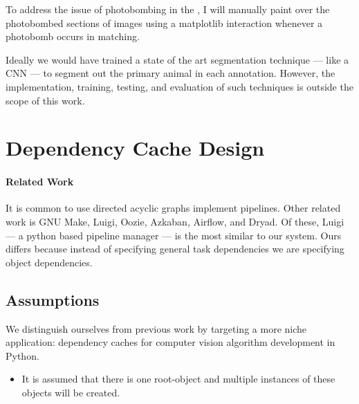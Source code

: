             To address the issue of photobombing in the \GGR{}, I will
              manually paint over the photobombed sections of images
              using a matplotlib  interaction whenever a
              photobomb occurs in matching.

            Ideally we would have trained a state of the art segmentation
              technique --- like a CNN --- to segment out the primary animal in
              each annotation.
            However, the implementation, training, testing, and evaluation of
              such techniques is outside the scope of this work.
\begin{comment}
./mass_tex_fixes.py --outline --fpaths chapter5-systemchapter.tex --numlines=1
\end{comment}


\section{Dependency Cache Design}\label{sec:depc}

    \paragraph{Related Work}

        It is common to use directed acyclic graphs implement
          pipelines.
        Other related work is GNU Make, Luigi, Oozie, Azkaban,
          Airflow, and Dryad.
        Of these, Luigi --- a python based pipeline manager --- is the
          most similar to our system.
        Ours differs because instead of specifying general task
          dependencies we are specifying object dependencies.

    \subsection{Assumptions}
        We distinguish ourselves from previous work by targeting a
          more niche application:
        dependency caches for computer vision algorithm development in
          Python.

         \begin{itemize}
            \item It is assumed that there is one root-object and multiple
              instances of these objects will be created.
         \end{itemize}

